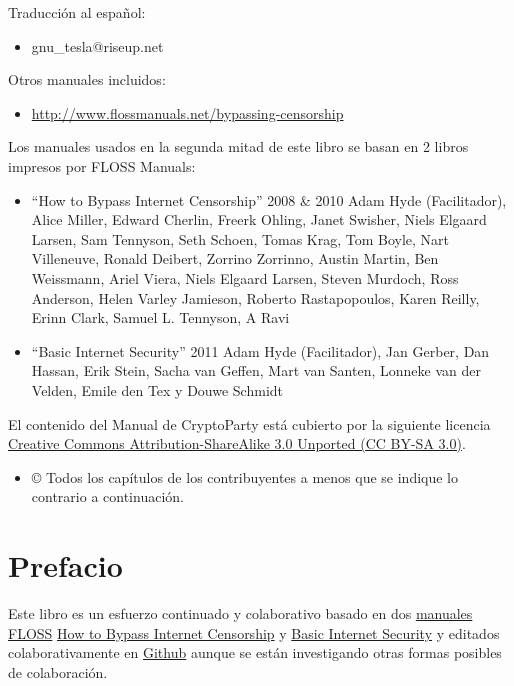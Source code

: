 \documentclass[10pt,a5paper,twoside,,]{book}
\providecommand{\tightlist}{%
  \setlength{\itemsep}{0pt}\setlength{\parskip}{0pt}}
\begin{document}
Traducción al español:

\begin{itemize}
\tightlist
\item
  gnu\_tesla@riseup.net
\end{itemize}

Otros manuales incluidos:

\begin{itemize}
\tightlist
\item
  \href{https://www.flossmanuals.net/bypassing-censorship}{http://www.flossmanuals.net/bypassing-censorship}
\end{itemize}

Los manuales usados en la segunda mitad de este libro se basan en 2
libros impresos por FLOSS Manuals:

\begin{itemize}
\item
  ``How to Bypass Internet Censorship'' 2008 \& 2010 Adam Hyde
  (Facilitador), Alice Miller, Edward Cherlin, Freerk Ohling, Janet
  Swisher, Niels Elgaard Larsen, Sam Tennyson, Seth Schoen, Tomas Krag,
  Tom Boyle, Nart Villeneuve, Ronald Deibert, Zorrino Zorrinno, Austin
  Martin, Ben Weissmann, Ariel Viera, Niels Elgaard Larsen, Steven
  Murdoch, Ross Anderson, Helen Varley Jamieson, Roberto Rastapopoulos,
  Karen Reilly, Erinn Clark, Samuel L. Tennyson, A Ravi
\item
  ``Basic Internet Security'' 2011 Adam Hyde (Facilitador), Jan Gerber,
  Dan Hassan, Erik Stein, Sacha van Geffen, Mart van Santen, Lonneke van
  der Velden, Emile den Tex y Douwe Schmidt
\end{itemize}

El contenido del Manual de CryptoParty está cubierto por la siguiente
licencia \href{https://creativecommons.org/licenses/by-sa/3.0/}{Creative
Commons Attribution-ShareAlike 3.0 Unported (CC BY-SA 3.0)}.

\begin{itemize}
\tightlist
\item
  © Todos los capítulos de los contribuyentes a menos que se indique lo
  contrario a continuación.
\end{itemize}

\chapter{Prefacio}\label{prefacio}

Este libro es un esfuerzo continuado y colaborativo basado en dos
\href{https://www.flossmanuals.net}{manuales FLOSS}
\href{https://flossmanuals.net/bypassing-censorship}{How to Bypass
Internet Censorship} y
\href{https://flossmanuals.net/basic-internet-security/}{Basic Internet
Security} y editados colaborativamente en
\href{https://github.com/cryptoparty/handbook}{Github} aunque se están
investigando otras formas posibles de colaboración.
\end{document}
